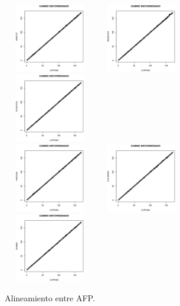 \begin{figure}[!htp]
\begin{center}
\centering
  \includegraphics[height=3cm, width=4cm]{c_d1.eps}
  \includegraphics[height=3cm, width=4cm]{c_d2.eps}
  \includegraphics[height=3cm, width=4cm]{c_d3.eps}\\
  \includegraphics[height=3cm, width=4cm]{c_d4.eps}
  \includegraphics[height=3cm, width=4cm]{c_d5.eps}
  \includegraphics[height=3cm, width=4cm]{c_d6.eps}
   \caption{Alineamiento entre AFP.}
\label{caja}
\end{center}
\end{figure}

